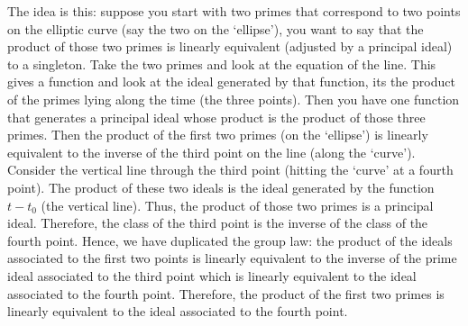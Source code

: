 \begin{ex}
\begin{enumerate}[(i)]
The idea is this: suppose you start with two primes that correspond to two points on the elliptic curve (say the two on the `ellipse'), you want to say that the product of those two primes is linearly equivalent (adjusted by a principal ideal) to a singleton. Take the two primes and look at the equation of the line. This gives a function and look at the ideal generated by that function, its the product of the primes lying along the time (the three points). Then you have one function that generates a principal ideal whose product is the product of those three primes. Then the product of the first two primes (on the `ellipse') is linearly equivalent to the inverse of the third point on the line (along the `curve'). Consider the vertical line through the third point (hitting the `curve' at a fourth point). The product of these two ideals is the ideal generated by the function $t-t_0$ (the vertical line). Thus, the product of those two primes is a principal ideal. Therefore, the class of the third point is the inverse of the class of the fourth point. Hence, we have duplicated the group law: the product of the ideals associated to the first two points is linearly equivalent to the inverse of the prime ideal associated to the third point which is linearly equivalent to the ideal associated to the fourth point. Therefore, the product of the first two primes is linearly equivalent to the ideal associated to the fourth point.





\end{enumerate}
\end{ex}
